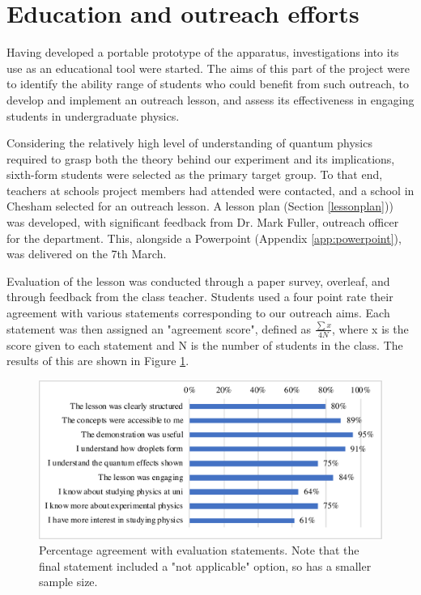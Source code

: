 \section{Education and outreach efforts}
Having developed a portable prototype of the apparatus, investigations into its use as an educational tool were started. The aims of this part of the project were to identify the ability range of students who could benefit from such outreach, to develop and implement an outreach lesson, and assess its effectiveness in engaging students in undergraduate physics.

Considering the relatively high level of understanding of quantum physics required to grasp both the theory behind our experiment and its implications, sixth-form students were selected as the primary target group. To that end, teachers at schools project members had attended were contacted, and a school in Chesham selected for an outreach lesson. A lesson plan (Section \ref{lessonplan})) was developed, with significant feedback from Dr. Mark Fuller, outreach officer for the department. This, alongside a Powerpoint (Appendix \ref{app:powerpoint}), was delivered on the 7th March.

Evaluation of the lesson was conducted through a paper survey, overleaf, and through feedback from the class teacher. Students used a four point rate their agreement with various statements corresponding to our outreach aims. Each statement was then assigned an "agreement score", defined as $\frac{\sum{x}}{4N}$, where x is the score given to each statement and N is the number of students in the class. The results of this are shown in Figure \ref{fig:evaluationchart}.

\begin{figure}[h]
\centering
\includegraphics[width=\textwidth]{education/evaluationchart.pdf}
\caption{Percentage agreement with evaluation statements. Note that the final statement included a "not applicable" option, so has a smaller sample size.}
\label{fig:evaluationchart}
\end{figure}

